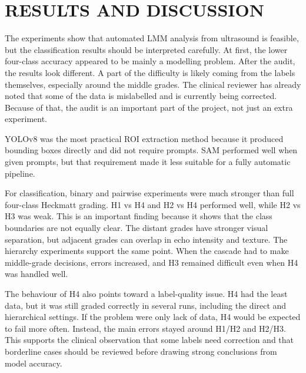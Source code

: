 \chapter{RESULTS AND DISCUSSION}
\label{discussion}
The experiments show that automated LMM analysis from ultrasound is feasible, but the classification results should be interpreted carefully. At first, the lower four-class accuracy appeared to be mainly a modelling problem. After the audit, the results look different. A part of the difficulty is likely coming from the labels themselves, especially around the middle grades. The clinical reviewer has already noted that some of the data is mislabelled and is currently being corrected. Because of that, the audit is an important part of the project, not just an extra experiment.

YOLOv8 was the most practical ROI extraction method because it produced bounding boxes directly and did not require prompts. SAM performed well when given prompts, but that requirement made it less suitable for a fully automatic pipeline.

For classification, binary and pairwise experiments were much stronger than full four-class Heckmatt grading. H1 vs H4 and H2 vs H4 performed well, while H2 vs H3 was weak. This is an important finding because it shows that the class boundaries are not equally clear. The distant grades have stronger visual separation, but adjacent grades can overlap in echo intensity and texture. The hierarchy experiments support the same point. When the cascade had to make middle-grade decisions, errors increased, and H3 remained difficult even when H4 was handled well.

The behaviour of H4 also points toward a label-quality issue. H4 had the least data, but it was still graded correctly in several runs, including the direct and hierarchical settings. If the problem were only lack of data, H4 would be expected to fail more often. Instead, the main errors stayed around H1/H2 and H2/H3. This supports the clinical observation that some labels need correction and that borderline cases should be reviewed before drawing strong conclusions from model accuracy.

